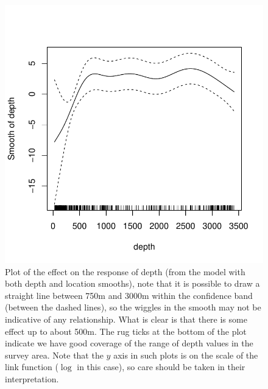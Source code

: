 \documentclass[a4paper,12pt]{article}
\begin{document}
\begin{figure}[h!]
  \caption{Plot of the effect on the response of depth (from the model with both depth and location smooths), note that it is possible to draw a straight line between 750m and 3000m within the confidence band (between the dashed lines), so the wiggles in the smooth may not be indicative of any relationship. What is clear is that there is some effect up to about 500m. The rug ticks at the bottom of the plot indicate we have good coverage of the range of depth values in the survey area. Note that the $y$ axis in such plots is on the scale of the link function ($\log$ in this case), so care should be taken in their interpretation.}
  \label{depth-gamplot}
  \begin{center}
    \includegraphics[width=\textwidth]{fit-depth-gam}
  \end{center}
\end{figure}

\newpage
\end{document}
